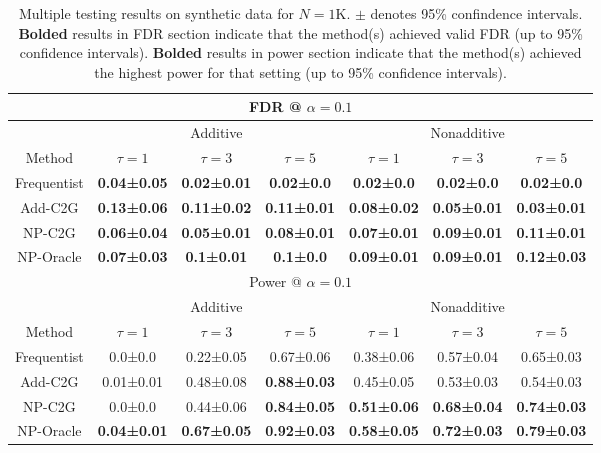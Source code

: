 \begin{table}[t]
\centering
\begin{tabular}{||c|c|c|c|c|c|c||}
\hline
\multicolumn{7}{|c|}{FDR @ $\alpha=0.1$} \\
\hline
& \multicolumn{3}{|c|}{Additive} & \multicolumn{3}{|c|}{Nonadditive} \\
\hline
Method & $\tau=1$ & $\tau=3$ & $\tau=5$ & $\tau=1$ & $\tau=3$ & $\tau=5$ \\
\hline
Frequentist & \textbf{ 0.04±0.05 } & \textbf{ 0.02±0.01 } & \textbf{ 0.02±0.0 } & \textbf{ 0.02±0.0 } & \textbf{ 0.02±0.0 } & \textbf{ 0.02±0.0 } \\
Add-C2G & \textbf{ 0.13±0.06 } & \textbf{ 0.11±0.02 } & \textbf{ 0.11±0.01 } & \textbf{ 0.08±0.02 } & \textbf{ 0.05±0.01 } & \textbf{ 0.03±0.01 } \\
NP-C2G & \textbf{ 0.06±0.04 } & \textbf{ 0.05±0.01 } & \textbf{ 0.08±0.01 } & \textbf{ 0.07±0.01 } & \textbf{ 0.09±0.01 } & \textbf{ 0.11±0.01 } \\
NP-Oracle & \textbf{ 0.07±0.03 } & \textbf{ 0.1±0.01 } & \textbf{ 0.1±0.0 } & \textbf{ 0.09±0.01 } & \textbf{ 0.09±0.01 } & \textbf{ 0.12±0.03 } \\
\hline
\hline
\multicolumn{7}{|c|}{Power @ $\alpha=0.1$} \\
\hline
& \multicolumn{3}{|c|}{Additive} & \multicolumn{3}{|c|}{Nonadditive} \\
\hline
Method & $\tau=1$ & $\tau=3$ & $\tau=5$ & $\tau=1$ & $\tau=3$ & $\tau=5$ \\
\hline
Frequentist & 0.0±0.0 & 0.22±0.05 & 0.67±0.06 & 0.38±0.06 & 0.57±0.04 & 0.65±0.03 \\
Add-C2G & 0.01±0.01 & 0.48±0.08 & \textbf{ 0.88±0.03 } & 0.45±0.05 & 0.53±0.03 & 0.54±0.03 \\
NP-C2G & 0.0±0.0 & 0.44±0.06 & \textbf{ 0.84±0.05 } & \textbf{ 0.51±0.06 } & \textbf{ 0.68±0.04 } & \textbf{ 0.74±0.03 } \\
NP-Oracle & \textbf{ 0.04±0.01 } & \textbf{ 0.67±0.05 } & \textbf{ 0.92±0.03 } & \textbf{ 0.58±0.05 } & \textbf{ 0.72±0.03 } & \textbf{ 0.79±0.03 } \\
\hline
\end{tabular}
\caption{Multiple testing results on synthetic data for $N=1$K. $\pm$ denotes 95\% confindence intervals. \textbf{Bolded} results in FDR section indicate that the method(s) achieved valid FDR (up to 95\% confidence intervals). \textbf{Bolded} results in power section indicate that the method(s) achieved the highest power for that setting (up to 95\% confidence intervals).}
\label{table:synthetic-simulations}
\end{table}


